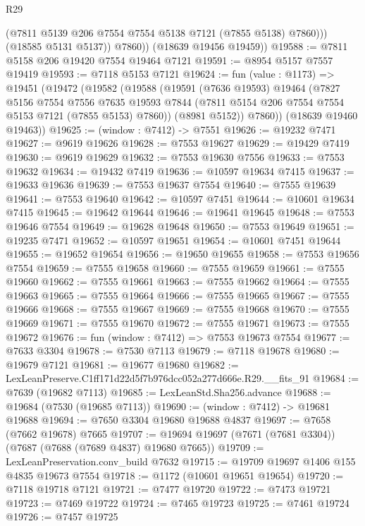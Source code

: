 \begin{lexlean}{R29}
\begin{coremodule}
                (@7811 @5139 @206 @7554 @7554 @5138 @7121 (@7855 @5138) @7860)))
            (@18585 @5131 @5137))
          @7860))
      (@18639 @19456 @19459))
@19588 := @7811 @5158 @206 @19420 @7554 @19464 @7121
@19591 := @8954 @5157 @7557 @19419
@19593 := @7118 @5153 @7121
@19624 := fun (value : @1173) =>
  @19451
    (@19472
      (@19582
        (@19588
          (@19591
            (@7636 @19593)
            @19464
            (@7827
              @5156
              @7554
              @7556
              @7635
              @19593
              @7844
              (@7811 @5154 @206 @7554 @7554 @5153 @7121 (@7855 @5153) @7860))
            (@8981 @5152))
          @7860))
      (@18639 @19460 @19463))
@19625 := (window : @7412) -> @7551
@19626 := @19232 @7471
@19627 := @9619 @19626
@19628 := @7553 @19627
@19629 := @19429 @7419
@19630 := @9619 @19629
@19632 := @7553 @19630 @7556
@19633 := @7553 @19632
@19634 := @19432 @7419
@19636 := @10597 @19634 @7415
@19637 := @19633 @19636
@19639 := @7553 @19637 @7554
@19640 := @7555 @19639
@19641 := @7553 @19640
@19642 := @10597 @7451
@19644 := @10601 @19634 @7415
@19645 := @19642 @19644
@19646 := @19641 @19645
@19648 := @7553 @19646 @7554
@19649 := @19628 @19648
@19650 := @7553 @19649
@19651 := @19235 @7471
@19652 := @10597 @19651
@19654 := @10601 @7451 @19644
@19655 := @19652 @19654
@19656 := @19650 @19655
@19658 := @7553 @19656 @7554
@19659 := @7555 @19658
@19660 := @7555 @19659
@19661 := @7555 @19660
@19662 := @7555 @19661
@19663 := @7555 @19662
@19664 := @7555 @19663
@19665 := @7555 @19664
@19666 := @7555 @19665
@19667 := @7555 @19666
@19668 := @7555 @19667
@19669 := @7555 @19668
@19670 := @7555 @19669
@19671 := @7555 @19670
@19672 := @7555 @19671
@19673 := @7555 @19672
@19676 := fun (window : @7412) => @7553 @19673 @7554
@19677 := @7633 @3304
@19678 := @7530 @7113
@19679 := @7118 @19678
@19680 := @19679 @7121
@19681 := @19677 @19680
@19682 := LexLeanPreserve.C1ff171d22d5f7b976dcc052a277d666e.R29.__fits_91
@19684 := @7639 (@19682 @7113)
@19685 := LexLeanStd.Sha256.advance
@19688 := @19684 (@7530 (@19685 @7113))
@19690 := (window : @7412) -> @19681 @19688
@19694 := @7650 @3304 @19680 @19688 @4837
@19697 := @7658 (@7662 @19678) @7665
@19707 := @19694 @19697 (@7671 (@7681 @3304)) (@7687 (@7688 (@7689 @4837) @19680 @7665))
@19709 := LexLeanPreservation.conv_build @7632
@19715 := @19709 @19697 @1406 @155 @4835 @19673 @7554
@19718 := @1172 (@10601 @19651 @19654)
@19720 := @7118 @19718 @7121
@19721 := @7477 @19720
@19722 := @7473 @19721
@19723 := @7469 @19722
@19724 := @7465 @19723
@19725 := @7461 @19724
@19726 := @7457 @19725

\end{coremodule}
\end{lexlean}
